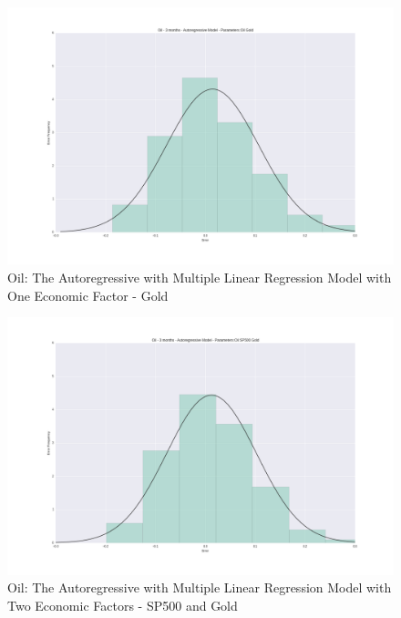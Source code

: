 \documentclass[runningheads]{llncs}
\begin{document}
\begin{figure}
\centering
\includegraphics[width=\textwidth]{Oil_Gold.png}
\caption{Oil: The Autoregressive with Multiple Linear Regression Model with One Economic Factor - Gold}
\label{fig:Oil_Gold.png}
\end{figure}

\begin{figure}
\centering
\includegraphics[width=\textwidth]{Oil_SP500_Gold.png}
\caption{Oil: The Autoregressive with Multiple Linear Regression Model with Two Economic Factors - SP500 and Gold}
\label{fig:Oil_SP500_Gold.png}
\end{figure}
\end{document}
